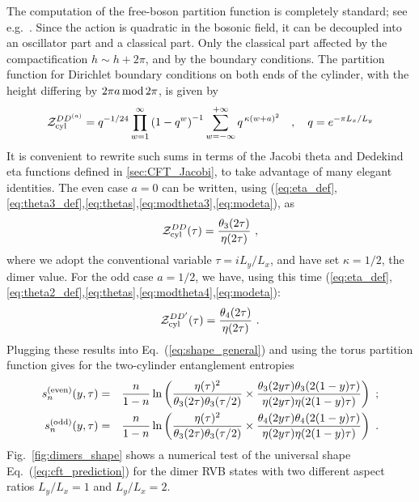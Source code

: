 \documentclass[11pt]{iopart}
\begin{document}
The computation of the free-boson partition function is completely standard; see e.g.\ \cite{EggertAffleck,FSW,BigYellowBook}. Since the action is quadratic in the bosonic field, it can be decoupled into an oscillator part and a classical part. Only the classical part affected by the compactification $h\sim h+2\pi$, and by the boundary conditions. The partition function for Dirichlet boundary conditions on both ends of the cylinder, with the height differing by $2\pi a\, {\rm mod }\,2\pi$, is given by
\begin{equation}
 \mathcal{Z}_{\rm cyl}^{DD^{(a)}}=q^{-1/24}\prod_{w=1}^{\infty}\left(1-q^w\right)^{-1}\sum_{w=-\infty}^{+\infty}q^{\,\kappa (w+a)^2}\quad,\quad q=e^{-\pi L_x/L_y}
\end{equation}
It is convenient to rewrite such sums in terms of the Jacobi theta and Dedekind eta functions defined in \ref{sec:CFT_Jacobi}, to take advantage of many elegant identities. 
The even case $a=0$ can be written, using (\ref{eq:eta_def},\ref{eq:theta3_def},\ref{eq:thetas},\ref{eq:modtheta3},\ref{eq:modeta}), as
\begin{equation}\label{eq:cylinder_dd}
 \mathcal{Z}_{\rm cyl}^{DD}(\tau)=\frac{\theta_3(2\tau)}{\eta(2\tau)}\ ,
\end{equation}
where we adopt the conventional variable  $\tau=i L_y/L_x$, and have set $\kappa=1/2$, the dimer value.
For the odd case $a=1/2$, we have, using this time (\ref{eq:eta_def},\ref{eq:theta2_def},\ref{eq:thetas},\ref{eq:modtheta4},\ref{eq:modeta}):
\begin{equation}
\label{eq:cylinder_ddprime}
 \mathcal{Z}_{\rm cyl}^{DD^\prime}(\tau)=\frac{\theta_4(2\tau)}{\eta(2\tau)}\ .
\end{equation}
Plugging these results into Eq.~(\ref{eq:shape_general}) and using the torus partition function \cite{Ginsparg,BigYellowBook} gives for the two-cylinder entanglement entropies
\begin{eqnarray}\label{eq:cft_prediction}
 s_n^{\rm (even)}(y,\tau)&=&\frac{n}{1-n}\ln \left(\frac{\eta(\tau)^2}{\theta_3(2\tau)\theta_3(\tau/2)}\times\frac{\theta_3(2y \tau)\theta_3(2(1-y)\tau)}{\eta(2y\tau)\eta(2(1-y)\tau)}\right)\ ;\\
 \label{eq:cft_prediction_odd}
 s_n^{\rm (odd)}(y,\tau)&=&\frac{n}{1-n}\ln \left(\frac{\eta(\tau)^2}{\theta_3(2\tau)\theta_3(\tau/2)}\times\frac{\theta_4(2y \tau)\theta_4(2(1-y)\tau)}{\eta(2y\tau)\eta(2(1-y)\tau)}\right)\ .
\end{eqnarray}
Fig.~\ref{fig:dimers_shape} shows a numerical test of the universal shape Eq.~(\ref{eq:cft_prediction}) for the dimer RVB states with two different aspect ratios $L_y/L_x=1$ and $L_y/L_x=2$.  
\end{document}
